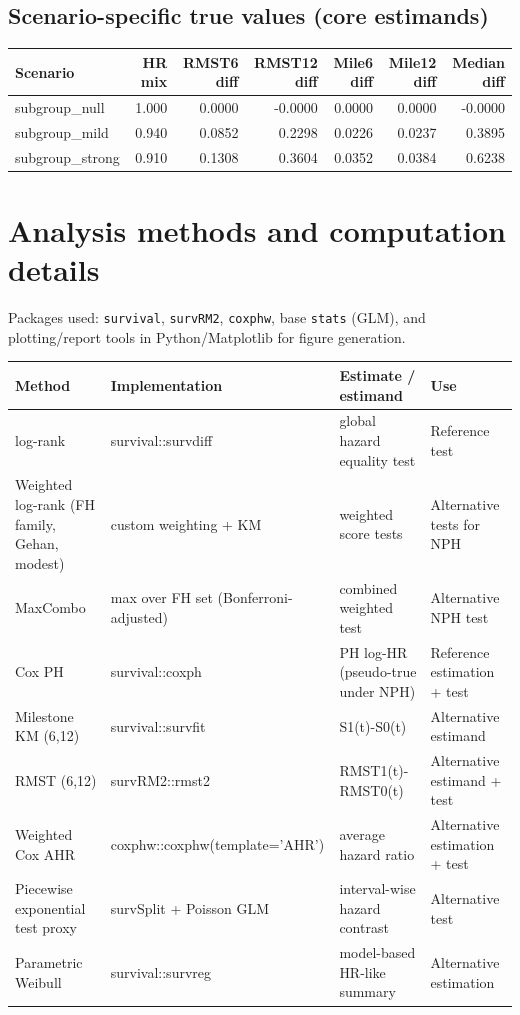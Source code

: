 \documentclass[11pt]{article}
\begin{document}
\subsection*{Scenario-specific true values (core estimands)}
\begin{center}
\begin{tabular}{lrrrrrr}
\toprule
Scenario & HR mix & RMST6 diff & RMST12 diff & Mile6 diff & Mile12 diff & Median diff \\
\midrule
subgroup\_null & 1.000 & 0.0000 & -0.0000 & 0.0000 & 0.0000 & -0.0000 \\
subgroup\_mild & 0.940 & 0.0852 & 0.2298 & 0.0226 & 0.0237 & 0.3895 \\
subgroup\_strong & 0.910 & 0.1308 & 0.3604 & 0.0352 & 0.0384 & 0.6238 \\
\bottomrule
\end{tabular}
\end{center}

\section{Analysis methods and computation details}
Packages used: \texttt{survival}, \texttt{survRM2}, \texttt{coxphw}, base \texttt{stats} (GLM), and plotting/report tools in Python/Matplotlib for figure generation.

\begin{center}
\begin{tabular}{p{3.2cm}p{3.5cm}p{4.2cm}p{3.2cm}}
\toprule
Method & Implementation & Estimate / estimand & Use \\
\midrule
log-rank & survival::survdiff & global hazard equality test & Reference test \\
Weighted log-rank (FH family, Gehan, modest) & custom weighting + KM & weighted score tests & Alternative tests for NPH \\
MaxCombo & max over FH set (Bonferroni-adjusted) & combined weighted test & Alternative NPH test \\
Cox PH & survival::coxph & PH log-HR (pseudo-true under NPH) & Reference estimation + test \\
Milestone KM (6,12) & survival::survfit & S1(t)-S0(t) & Alternative estimand \\
RMST (6,12) & survRM2::rmst2 & RMST1(t)-RMST0(t) & Alternative estimand + test \\
Weighted Cox AHR & coxphw::coxphw(template='AHR') & average hazard ratio & Alternative estimation + test \\
Piecewise exponential test proxy & survSplit + Poisson GLM & interval-wise hazard contrast & Alternative test \\
Parametric Weibull & survival::survreg & model-based HR-like summary & Alternative estimation \\
\bottomrule
\end{tabular}
\end{center}
\end{document}
